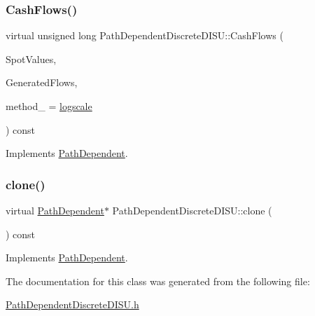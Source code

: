 \subsubsection{\texorpdfstring{Cash\+Flows()}{CashFlows()}}
{\footnotesize\ttfamily virtual unsigned long Path\+Dependent\+Discrete\+D\+I\+S\+U\+::\+Cash\+Flows (\begin{DoxyParamCaption}\item[{const \hyperlink{classMJArray}{M\+J\+Array} \&}]{Spot\+Values,  }\item[{std\+::vector$<$ \hyperlink{classMyCashFlow_1_1CashFlow}{My\+Cash\+Flow\+::\+Cash\+Flow} $>$ \&}]{Generated\+Flows,  }\item[{\hyperlink{PathDependent_8h_abed946c62f140eb7ff2ac742e6ad9497}{method}}]{method\+\_\+ = {\ttfamily \hyperlink{PathDependent_8h_abed946c62f140eb7ff2ac742e6ad9497a064d3d3358889658ce07fe9f3191d1fd}{logscale}} }\end{DoxyParamCaption}) const\hspace{0.3cm}{\ttfamily [virtual]}}



Implements \hyperlink{classPathDependent_a5d5b1d6ecf9dc6be128fff9694f589c8}{Path\+Dependent}.

\hypertarget{classPathDependentDiscreteDISU_afb23c79ccf3bb133ea5b56be1dbd61e8}{}\label{classPathDependentDiscreteDISU_afb23c79ccf3bb133ea5b56be1dbd61e8} 
\subsubsection{\texorpdfstring{clone()}{clone()}}
{\footnotesize\ttfamily virtual \hyperlink{classPathDependent}{Path\+Dependent}$\ast$ Path\+Dependent\+Discrete\+D\+I\+S\+U\+::clone (\begin{DoxyParamCaption}{ }\end{DoxyParamCaption}) const\hspace{0.3cm}{\ttfamily [virtual]}}



Implements \hyperlink{classPathDependent_afcc10647f591175642c6dc0adba23f0b}{Path\+Dependent}.



The documentation for this class was generated from the following file\+:\begin{DoxyCompactItemize}
\item 
\hyperlink{PathDependentDiscreteDISU_8h}{Path\+Dependent\+Discrete\+D\+I\+S\+U.\+h}\end{DoxyCompactItemize}
